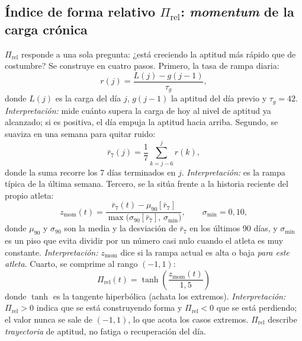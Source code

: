 \documentclass[11pt,a4paper]{article}
\begin{document}
\subsection{Índice de forma relativo $\Pi_{\mathrm{rel}}$: \emph{momentum} de la carga crónica}
\label{sec:pirel}
$\Pi_{\mathrm{rel}}$ responde a una sola pregunta: ¿está creciendo la aptitud más rápido que de costumbre? Se construye en cuatro pasos. Primero, la tasa de rampa diaria:
\begin{equation}
r(j) = \frac{L(j) - g(j-1)}{\tau_g},
\label{eq:ramp}
\end{equation}
donde $L(j)$ es la carga del día $j$, $g(j-1)$ la aptitud del día previo y $\tau_g=42$. \textit{Interpretación:} mide cuánto supera la carga de hoy al nivel de aptitud ya alcanzado; si es positiva, el día empuja la aptitud hacia arriba. Segundo, se suaviza en una semana para quitar ruido:
\begin{equation}
\bar{r}_7(j) = \frac{1}{7}\sum_{k=j-6}^{j} r(k),
\label{eq:ramp7}
\end{equation}
donde la suma recorre los 7 días terminados en $j$. \textit{Interpretación:} es la rampa típica de la última semana. Tercero, se la sitúa frente a la historia reciente del propio atleta:
\begin{equation}
z_{\mathrm{mom}}(t) = \frac{\bar{r}_7(t) - \mu_{90}\!\left[\bar{r}_7\right]}{\max\!\big(\sigma_{90}\!\left[\bar{r}_7\right],\,\sigma_{\min}\big)},
\qquad \sigma_{\min} = 0{,}10,
\label{eq:zmom}
\end{equation}
donde $\mu_{90}$ y $\sigma_{90}$ son la media y la desviación de $\bar{r}_7$ en los últimos 90 días, y $\sigma_{\min}$ es un piso que evita dividir por un número casi nulo cuando el atleta es muy constante. \textit{Interpretación:} $z_{\mathrm{mom}}$ dice si la rampa actual es alta o baja \emph{para este atleta}. Cuarto, se comprime al rango $(-1,1)$:
\begin{equation}
\boxed{\;\Pi_{\mathrm{rel}}(t) = \tanh\!\left(\frac{z_{\mathrm{mom}}(t)}{1{,}5}\right)\;}
\label{eq:pirel}
\end{equation}
donde $\tanh$ es la tangente hiperbólica (achata los extremos). \textit{Interpretación:} $\Pi_{\mathrm{rel}}>0$ indica que se está construyendo forma y $\Pi_{\mathrm{rel}}<0$ que se está perdiendo; el valor nunca se sale de $(-1,1)$, lo que acota los casos extremos. $\Pi_{\mathrm{rel}}$ describe \emph{trayectoria} de aptitud, no fatiga o recuperación del día.
\end{document}
